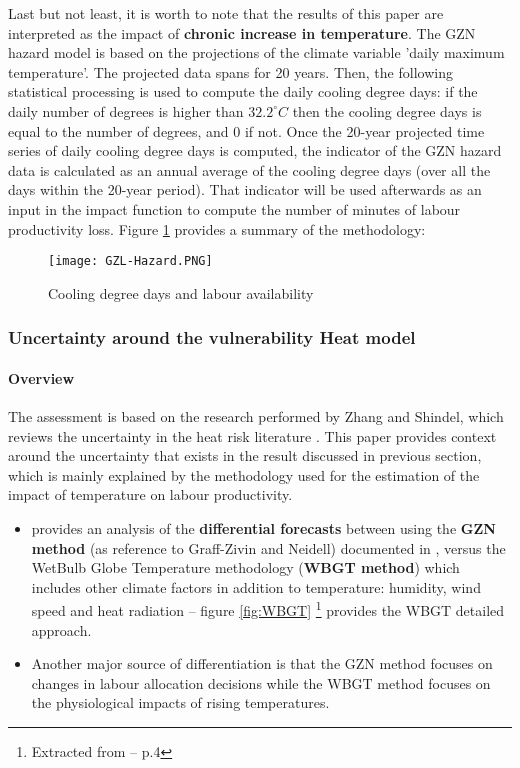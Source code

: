 \documentclass{article}
\begin{document}
Last but not least, it is worth to note that the results of this paper are interpreted as the impact of \textbf{chronic increase in temperature}.
The GZN hazard  model is based on the projections of the climate variable 'daily maximum temperature'. The projected data spans for 20 years. Then, the following statistical processing is used to compute the daily cooling degree days: if the daily number of degrees is higher than $32.2^\circ C$ then the cooling degree days is equal to the number of degrees, and 0 if not. Once the 20-year projected time series of daily cooling degree days is computed, the indicator of the GZN hazard data is calculated as an annual average of the cooling degree days (over all the days within the 20-year period). That indicator will be used afterwards as an input in the impact function to compute the number of minutes of labour productivity loss. Figure \ref{fig:GZL-Hazard} provides a summary of the methodology:

\begin{figure}[h]
    \centering
    \texttt{[image: GZL-Hazard.PNG]}
    \caption{Cooling degree days and labour availability}
    \label{fig:GZL-Hazard}
\end{figure}


\subsubsection{Uncertainty around the vulnerability Heat model}

\paragraph{Overview}
The assessment is based on the research performed by Zhang and Shindel, which reviews the uncertainty in the heat risk literature \cite{ZhangAndShindell:2021}. This paper provides context around the uncertainty that exists in the result discussed in previous section, which is mainly explained by the methodology used for the estimation of the impact of temperature on labour productivity. 
\begin{itemize}
    \item \cite{ZhangAndShindell:2021} provides an analysis of the \textbf{differential forecasts} between using the \textbf{GZN method} (as reference to Graff-Zivin and Neidell) documented in \cite{TemperatureAndWork:2021}, versus the WetBulb Globe Temperature methodology (\textbf{WBGT method}) which includes other climate factors in addition to temperature: humidity, wind speed and heat radiation -- figure \ref{fig:WBGT} \footnote{Extracted from \cite{ZhangAndShindell:2021} -- p.4} provides the WBGT detailed approach. 
    \item Another major source of differentiation is that the GZN method focuses on changes in labour allocation decisions while the WBGT method focuses on the physiological impacts of rising temperatures.
\end{itemize}
\end{document}
